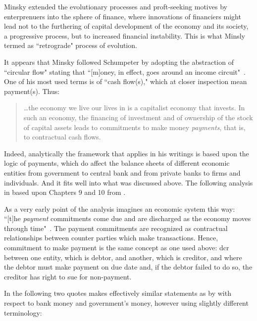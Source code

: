 Minsky extended the evolutionary processes and proft-seeking motives by enterprenuers into the sphere of finance, where innovations of financiers might lead not to the furthering of capital development of the economy and its society, a progressive process, but to increased financial instability. This is what Minsly termed as ``retrograde" process of evolution. 

It appears that Minsky followed Schumpeter by adopting the abstraction of ``circular flow" stating that ``[m]oney, in effect, goes around an income circuit"~\citep[p.~223]{minsky1986}.
One of his most used terms is of ``cash flow(s)," which at closer inspection mean payment(s). Thus:

\begin{quote}
\dots the economy we live our lives in is a capitalist economy that invests. In such an economy, the financing of investment and of ownership of the stock of capital assets leads to commitments to make money \textit{payments}, that is, to contractual cash flows.~\citep[pp.~157-158, emphasis added]{minsky1986}\par
\end{quote}

Indeed, analytically the framework that \citeauthor{minsky1986} applies in his writings is based upon the logic of payments, which do affect the balance sheets of different economic entities from government to central bank and from private banks to firms and individuals. And it fits well into what was discussed above. The following analysis in based upon Chapters 9 and 10 from \cite{minsky1986}.

As a very early point of the analysis \citeauthor{minsky1986} imagines an economic system this way: ``[t]he \textit{payment} commitments come due and are discharged as the economy moves through time"~\citep[p.~219, emphasis added]{minsky1986}. The payment commitments are recognized as contractual relationships between counter parties which make transactions. Hence, commitment to make payment is the same concept as one used above: \acf{dcr} between one entity, which is debtor, and another, which is creditor, and where the debtor must make payment on due date and, if the debtor failed to do so, the creditor has right to sue for non-payment.

In the following two quotes \cite{minsky1986} makes effectively similar statements as by \cite{innes1913} with respect to bank money and government's money, however using slightly different terminology:

